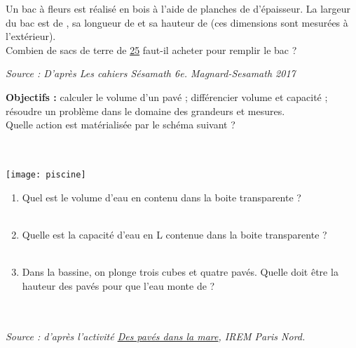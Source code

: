 \begin{colonne*exercice}
\bigskip

\begin{exercice} %
   Un bac à fleurs est réalisé en bois à l'aide de planches de  d'épaisseur. La largeur du bac est de , sa longueur de  et sa hauteur de  (ces dimensions sont mesurées à l'extérieur). \\
   Combien de sacs de terre de \ul{25} faut-il acheter pour remplir le bac  ?
\end{exercice}

\vfill\hfill{\it\footnotesize Source : D’après Les cahiers Sésamath 6e. Magnard-Sesamath 2017}

\end{colonne*exercice}


\Recreation

\begin{activite}
   {\bf Objectifs :} calculer le volume d'un pavé ; différencier volume et capacité ; résoudre un problème dans le domaine des grandeurs et mesures. \\

      \partie[observations]
         Quelle action est matérialisée par le schéma suivant ? \\ [2mm]
         \pf \\ [2mm]
         \pf \\
         \begin{center}
            \texttt{[image: piscine]}
         \end{center}
      \partie[questions]
         \begin{enumerate}
            \item Quel est le volume d'eau en \ucmc{} contenu dans la boite transparente ? \\ [3mm]
               \pf \\
            \item Quelle est la capacité d'eau en L contenue dans la boite transparente ? \\ [3mm]
               \pf \\
            \item Dans la bassine, on plonge trois cubes et quatre pavés. Quelle doit être la hauteur des pavés pour que l'eau monte de  ? \\ [2mm]
               \pf \\ [3mm]
               \pf \\ [3mm]
               \pf
         \end{enumerate}

      \vfill \hfill {\it\footnotesize Source : d'après l'activité \href{http://www-irem.univ-paris13.fr/site_spip/IMG/pdf/des_paves_dans_la_mare_2_noir.pdf}{Des pavés dans la mare}, IREM Paris Nord.}
\end{activite}

